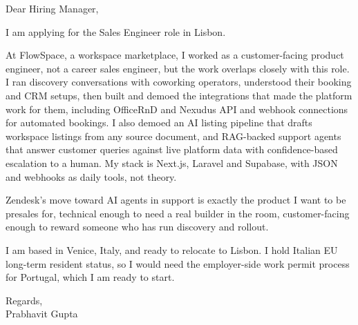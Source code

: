 \documentclass[a4paper,11pt]{article}
\begin{document}
Dear Hiring Manager,

I am applying for the Sales Engineer role in Lisbon.

At FlowSpace, a workspace marketplace, I worked as a customer-facing product engineer, not a career sales engineer, but the work overlaps closely with this role. I ran discovery conversations with coworking operators, understood their booking and CRM setups, then built and demoed the integrations that made the platform work for them, including OfficeRnD and Nexudus API and webhook connections for automated bookings. I also demoed an AI listing pipeline that drafts workspace listings from any source document, and RAG-backed support agents that answer customer queries against live platform data with confidence-based escalation to a human. My stack is Next.js, Laravel and Supabase, with JSON and webhooks as daily tools, not theory.

Zendesk's move toward AI agents in support is exactly the product I want to be presales for, technical enough to need a real builder in the room, customer-facing enough to reward someone who has run discovery and rollout.

I am based in Venice, Italy, and ready to relocate to Lisbon. I hold Italian EU long-term resident status, so I would need the employer-side work permit process for Portugal, which I am ready to start.

Regards,\\
Prabhavit Gupta
\end{document}
